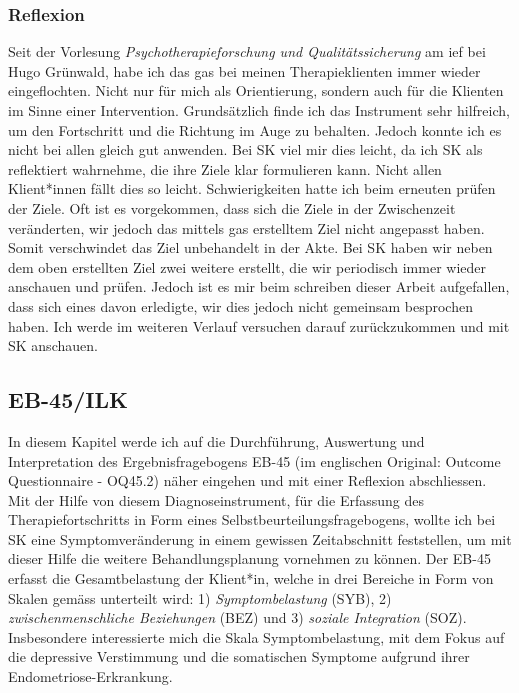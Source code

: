 \subsubsection{Reflexion}
Seit der Vorlesung \textit{Psychotherapieforschung und Qualitätssicherung} am \ac{ief} bei Hugo Grünwald, habe ich das \ac{gas} bei meinen Therapieklienten immer wieder eingeflochten. Nicht nur für mich als Orientierung, sondern auch für die Klienten im Sinne einer Intervention. Grundsätzlich finde ich das Instrument sehr hilfreich, um den Fortschritt und die Richtung im Auge zu behalten. Jedoch konnte ich es nicht bei allen gleich gut anwenden. Bei SK viel mir dies leicht, da ich SK als reflektiert wahrnehme, die ihre Ziele klar formulieren kann. Nicht allen Klient*innen fällt dies so leicht. Schwierigkeiten hatte ich beim erneuten prüfen der Ziele. Oft ist es vorgekommen, dass sich die Ziele in der Zwischenzeit veränderten, wir jedoch das mittels \ac{gas} erstelltem Ziel nicht angepasst haben. Somit verschwindet das Ziel unbehandelt in der Akte. Bei SK haben wir neben dem oben erstellten Ziel zwei weitere erstellt, die wir periodisch immer wieder anschauen und prüfen. Jedoch ist es mir beim schreiben dieser Arbeit aufgefallen, dass sich eines davon erledigte, wir dies jedoch nicht gemeinsam besprochen haben. Ich werde im weiteren Verlauf versuchen darauf zurückzukommen und mit SK anschauen.

\subsection{EB-45/ILK}
In diesem Kapitel werde ich auf die Durchführung, Auswertung und Interpretation des Ergebnisfragebogens EB-45 (im englischen Original: Outcome Questionnaire - OQ45.2) näher eingehen \cite{Lambert2002} und mit einer Reflexion abschliessen. Mit der Hilfe von diesem Diagnoseinstrument, für die Erfassung des Therapiefortschritts in Form eines Selbstbeurteilungsfragebogens, wollte ich bei SK eine Symptomveränderung in einem gewissen Zeitabschnitt feststellen, um mit dieser Hilfe die weitere Behandlungsplanung vornehmen zu können. Der EB-45 erfasst die Gesamtbelastung der Klient*in, welche in drei Bereiche in Form von Skalen gemäss  unterteilt wird: 1) \textit{Symptombelastung} (SYB), 2) \textit{zwischenmenschliche Beziehungen} (BEZ) und 3) \textit{soziale Integration} (SOZ). Insbesondere interessierte mich die Skala Symptombelastung, mit dem Fokus auf die depressive Verstimmung und die somatischen Symptome aufgrund ihrer Endometriose-Erkrankung. 

